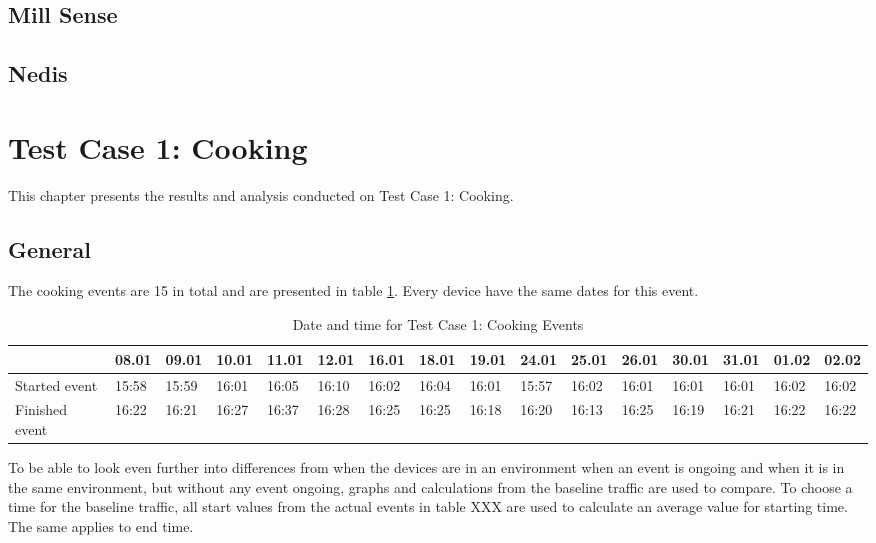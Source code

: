 \subsection{Mill Sense}
\subsection{Nedis}

\section{Test Case 1: Cooking}
This chapter presents the results and analysis conducted on Test Case 1: Cooking.
\subsection{General}
The cooking events are 15 in total and are presented in table \ref{tab:CookingDates}. Every device have the same dates for this event. 
\begin{table}[!hbtp]
    \centering
    \caption{Date and time for Test Case 1: Cooking Events}
    \begin{adjustbox}{width=1\textwidth}
            \begin{tabular}{l|l|l|l|l|l|l|l|l|l|l|l|l|l|l|l|}
            \cline{2-16} 
            & 08.01 & 09.01 & 10.01 & 11.01 & 12.01 & 16.01 & 18.01 & 19.01 & 24.01 & 25.01 & 26.01 & 30.01 & 31.01 & 01.02 & 02.02 \\
            \hline
            \multicolumn{1}{|l|}{Started event}  & 15:58 & 15:59 & 16:01 & 16:05 & 16:10 & 16:02 & 16:04 & 16:01 & 15:57 & 16:02 & 16:01 & 16:01 & 16:01 & 16:02 & 16:02 \\ 
            \hline
            \multicolumn{1}{|l|}{Finished event} & 16:22 & 16:21 & 16:27 & 16:37 & 16:28 & 16:25 & 16:25 & 16:18 & 16:20 & 16:13 & 16:25 & 16:19 & 16:21 & 16:22 & 16:22 \\ 
            \hline
            \end{tabular}
    \end{adjustbox}
    \label{tab:CookingDates}
\end{table}
\FloatBarrier

To be able to look even further into differences from when the devices are in an environment when an event is ongoing and when it is in the same environment, but without any event ongoing, graphs and calculations from the baseline traffic are used to compare. To choose a time for the baseline traffic, all start values from the actual events in table XXX are used to calculate an average value for starting time. The same applies to end time. 


